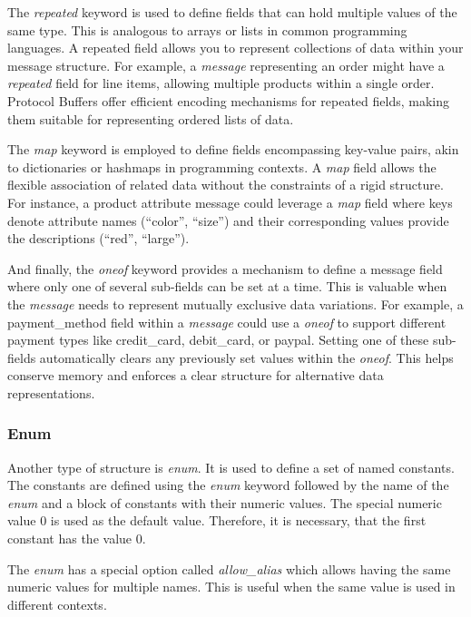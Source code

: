 The \textit{repeated} keyword is used to define fields that can hold multiple values of the same type.
This is analogous to arrays or lists in common programming languages.
A repeated field allows you to represent collections of data within your message structure.
For example, a \textit{message} representing an order might have a \textit{repeated} field for line items, allowing multiple products within a single order.
Protocol Buffers offer efficient encoding mechanisms for repeated fields, making them suitable for representing ordered lists of data.
\cite{protobuf-proto3}

The \textit{map} keyword is employed to define fields encompassing key-value pairs, akin to dictionaries or hashmaps in programming contexts.
A \textit{map} field allows the flexible association of related data without the constraints of a rigid structure.
For instance, a product attribute message could leverage a \textit{map} field where keys denote attribute names (``color'', ``size'') and their corresponding values provide the descriptions (``red'', ``large'').
\cite{protobuf-proto3}

And finally, the \textit{oneof} keyword provides a mechanism to define a message field where only one of several sub-fields can be set at a time.
This is valuable when the \textit{message} needs to represent mutually exclusive data variations.
For example, a payment\_method field within a \textit{message} could use a \textit{oneof} to support different payment types like credit\_card, debit\_card, or paypal.
Setting one of these sub-fields automatically clears any previously set values within the \textit{oneof}.
This helps conserve memory and enforces a clear structure for alternative data representations.
\cite{protobuf-proto3}

\subsubsection{Enum}
Another type of structure is \textit{enum}.
It is used to define a set of named constants.
The constants are defined using the \textit{enum} keyword followed by the name of the \textit{enum} and a block of constants with their numeric values.
The special numeric value 0 is used as the default value.
Therefore, it is necessary, that the first constant has the value 0.
\cite{protobuf-proto3}

The \textit{enum} has a special option called \textit{allow\_alias} which allows having the same numeric values for multiple names.
This is useful when the same value is used in different contexts.
\cite{protobuf-proto3}

